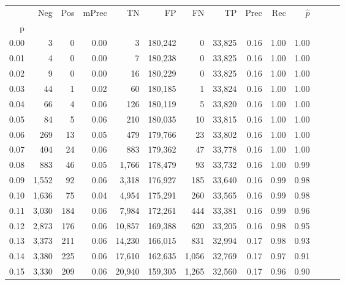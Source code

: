 \begin{tabular}{rrrrrrrrrrrrrr}
\toprule
{} &    Neg &  Pos & mPrec &       TN &       FP &      FN &      TP &  Prec &   Rec & $\hat{p}$ \\
p    &        &      &       &          &          &         &         &       &       &           \\
\midrule
0.00 &      3 &    0 &  0.00 &        3 &  180,242 &       0 &  33,825 &  0.16 &  1.00 &      1.00 \\
0.01 &      4 &    0 &  0.00 &        7 &  180,238 &       0 &  33,825 &  0.16 &  1.00 &      1.00 \\
0.02 &      9 &    0 &  0.00 &       16 &  180,229 &       0 &  33,825 &  0.16 &  1.00 &      1.00 \\
0.03 &     44 &    1 &  0.02 &       60 &  180,185 &       1 &  33,824 &  0.16 &  1.00 &      1.00 \\
0.04 &     66 &    4 &  0.06 &      126 &  180,119 &       5 &  33,820 &  0.16 &  1.00 &      1.00 \\
0.05 &     84 &    5 &  0.06 &      210 &  180,035 &      10 &  33,815 &  0.16 &  1.00 &      1.00 \\
0.06 &    269 &   13 &  0.05 &      479 &  179,766 &      23 &  33,802 &  0.16 &  1.00 &      1.00 \\
0.07 &    404 &   24 &  0.06 &      883 &  179,362 &      47 &  33,778 &  0.16 &  1.00 &      1.00 \\
0.08 &    883 &   46 &  0.05 &    1,766 &  178,479 &      93 &  33,732 &  0.16 &  1.00 &      0.99 \\
0.09 &  1,552 &   92 &  0.06 &    3,318 &  176,927 &     185 &  33,640 &  0.16 &  0.99 &      0.98 \\
0.10 &  1,636 &   75 &  0.04 &    4,954 &  175,291 &     260 &  33,565 &  0.16 &  0.99 &      0.98 \\
0.11 &  3,030 &  184 &  0.06 &    7,984 &  172,261 &     444 &  33,381 &  0.16 &  0.99 &      0.96 \\
0.12 &  2,873 &  176 &  0.06 &   10,857 &  169,388 &     620 &  33,205 &  0.16 &  0.98 &      0.95 \\
0.13 &  3,373 &  211 &  0.06 &   14,230 &  166,015 &     831 &  32,994 &  0.17 &  0.98 &      0.93 \\
0.14 &  3,380 &  225 &  0.06 &   17,610 &  162,635 &   1,056 &  32,769 &  0.17 &  0.97 &      0.91 \\
0.15 &  3,330 &  209 &  0.06 &   20,940 &  159,305 &   1,265 &  32,560 &  0.17 &  0.96 &      0.90 \\

\end{tabular}
